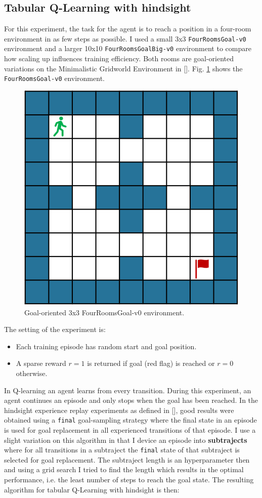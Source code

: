 \documentclass[conference]{IEEEtran}
\begin{document}
\subsection{Tabular Q-Learning with hindsight} \label{subsec:exp_tab_her}
For this experiment, the task for the agent is to reach a position in a four-room environment in as few steps as possible. I used a small 3x3 \texttt{FourRoomsGoal-v0} environment and a larger 10x10 \texttt{FourRoomsGoalBig-v0} environment to compare how scaling up influences training efficiency. Both rooms are goal-oriented variations on the Minimalistic Gridworld Environment in [\cite{gym_minigrid}]. Fig. \ref{fig:tabular_fourroomsgoal_env} shows the \texttt{FourRoomsGoal-v0} environment.
\begin{figure}[ht]
\centering
\includegraphics[width=0.5\columnwidth]{img/FourRoomsGoal-v0.png}
\caption{Goal-oriented 3x3 FourRoomsGoal-v0 environment.}
\label{fig:tabular_fourroomsgoal_env}
\end{figure}
The setting of the experiment is:
\begin{itemize}
    \item Each training episode has random start and goal position.
    \item A sparse reward $r = 1$ is returned if goal (red flag) is reached or $r = 0$ otherwise.
\end{itemize}
In Q-learning an agent learns from every transition. During this experiment, an agent continues an episode and only stops when the goal has been reached.
In the hindsight experience replay experiments as defined in [\cite{andrychowicz2017hindsight}], good results were obtained using a \texttt{final} goal-sampling strategy where the final state in an episode is used for goal replacement in all experienced transitions of that episode. I use a slight variation on this algorithm in that I device an episode into \textbf{subtrajects} where for all transitions in a subtraject the \texttt{final} state of that subtraject is selected for goal replacement. The subtraject length is an hyperparameter then and using a grid search I tried to find the length which results in the optimal performance, i.e. the least number of steps to reach the goal state. The resulting algorithm for tabular Q-Learning with hindsight is then:
\end{document}
